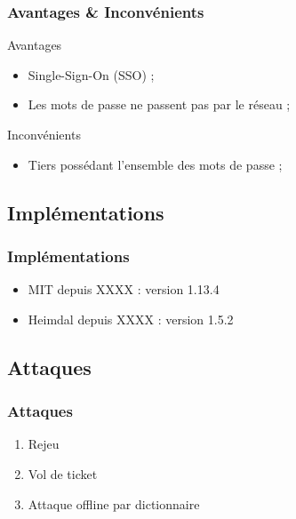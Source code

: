 \documentclass[svgnames]{beamer}
\begin{document}
\begin{frame}
 \frametitle{Avantages \& Inconvénients}
 
 
 \begin{exampleblock}{Avantages}
  \begin{itemize}
   \item Single-Sign-On (SSO) ;
   \item Les mots de passe ne passent pas par le réseau ;
  \end{itemize}
 \end{exampleblock}
 
 \pause
 
 \begin{alertblock}{Inconvénients}
  \begin{itemize}
   \item Tiers possédant l'ensemble des mots de passe ;
  \end{itemize}
 \end{alertblock}
\end{frame}

\subsection{Implémentations}

\begin{frame}
  \frametitle{Implémentations}
  
  \begin{itemize}
   \item MIT depuis XXXX : version 1.13.4 %
   \item Heimdal depuis XXXX : version 1.5.2 %
  \end{itemize}
  
  
\end{frame}


\subsection{Attaques}

\begin{frame}
 \frametitle{Attaques}
 
 \begin{enumerate}
  \item Rejeu
  \item Vol de ticket
  \item Attaque offline par dictionnaire
 \end{enumerate}

\end{frame}
\end{document}
